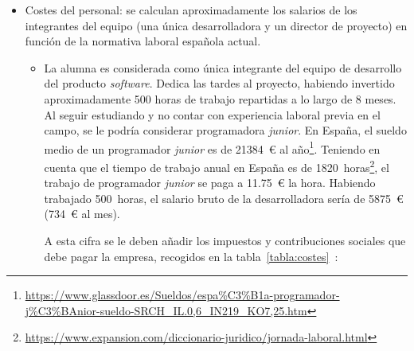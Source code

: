 \begin{itemize}
\begin{itemize}
    \item Licencia de GitHub Pro: plataforma de desarrollo colaborativo escogida para desarrollar el \textit{software} del proyecto. Se utiliza una licencia \textit{pro}, cuyo coste sería de 4~euros al mes\footnote{\url{https://github.com/settings/billing/summary}}, constituyendo un total de 32~€ durante todo el proyecto. En este caso, la licencia es gratis por ser estudiante.
    
    \item Jira: actualmente se utiliza el plan \textit{Free} ya que es gratuito pero, si se tratara de una empresa real, lo mínimo sería utilizar la versión \textit{Standard}, cuyo precio es de 7.75~€ al mes\footnote{\url{https://www.atlassian.com/es/software/jira/pricing}}, resultando en un total de 62~€ para todo el proyecto.
\end{itemize}


\item Costes del personal: se calculan aproximadamente los salarios de los integrantes del equipo (una única desarrolladora y un director de proyecto) en función de la normativa laboral española actual.
\begin{itemize}
    \item La alumna es considerada como única integrante del equipo de desarrollo del producto \textit{software}. Dedica las tardes al proyecto, habiendo invertido aproximadamente 500 horas de trabajo repartidas a lo largo de 8 meses. Al seguir estudiando y no contar con experiencia laboral previa en el campo, se le podría considerar programadora \textit{junior}. En España, el sueldo medio de un programador \textit{junior} es de 21384~€ al año\footnote{\url{https://www.glassdoor.es/Sueldos/espa\%C3\%B1a-programador-j\%C3\%BAnior-sueldo-SRCH_IL.0,6_IN219_KO7,25.htm}}.
    Teniendo en cuenta que el tiempo de trabajo anual en España es de 1820~horas\footnote{\url{https://www.expansion.com/diccionario-juridico/jornada-laboral.html}}, el trabajo de programador \textit{junior} se paga a 11.75~€ la hora. Habiendo trabajado 500~horas, el salario bruto de la desarrolladora sería de 5875~€ (734~€ al mes).
    
    A esta cifra se le deben añadir los impuestos y contribuciones sociales que debe pagar la empresa, recogidos en la tabla~\ref{tabla:costes}~\cite{costesxtrabajador}:
    

\end{itemize}
\end{itemize}
